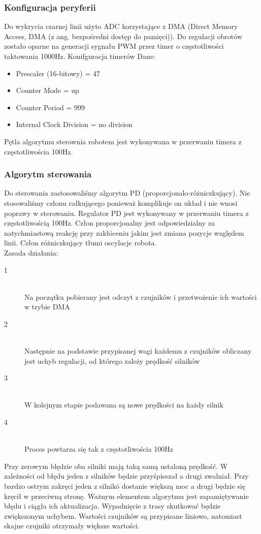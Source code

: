 \documentclass[12pt,a4paper]{article}
\begin{document}
\subsubsection{Konfiguracja peryferii}

Do wykrycia czarnej linii użyto ADC korzystające z DMA (Direct Memory Access, DMA (z ang. bezpośredni dostęp do pamięci)). Do regulacji obrotów zostało oparne na generacji sygnału PWM przez timer o częstotliwości taktowania 1000Hz. 
\newline Konifguracja timerów
\newline Dane:
\begin{itemize}
\item Prescaler (16-bitowy) = 47
\item Counter Mode = up
\item Counter Period = 999
\item Internal Clock Division = no division 
\end{itemize}
Pętla algorytmu sterownia robotem jest wykonywana w przerwaniu timera z częstotliwościa 100Hz.

\subsubsection{Algorytm sterowania}

Do sterowania zastosowaliśmy algorytm PD (proporcjonalo-różniczkujący). Nie stosowaliśmy członu całkującego ponieważ komplikuje on układ i nie wnosi poprawy w sterowaniu. Regulator PD jest wykonywany w przerwaniu timera z częstotliwością 100Hz. Człon proporcjonalny jest odpowiedzialny za natychmiastową reakcję przy zakłóceniu jakim jest zmiana pozycje względem linii. Człon różniczkujący tłumi oscylacje robota.
\\
\newline Zasada działania:
\begin{description}
\item[1] \hfill \\
 Na początku pobierany jest odczyt z czujników i przetwożenie ich wartości w trybie DMA
\item[2] \hfill \\
Następnie na podstawie przypisanej wagi każdemu z czujników obliczany jest uchyb regulacji, od którego zależy prędkość silników
\item[3] \hfill \\
W kolejnym etapie podawana są nowe prędkości na każdy silnik 
\item[4] \hfill \\
Proces powtarza się tak z częstotliwościa 100Hz
\end{description}
Przy zerowym blędzie oba silniki mają taką samą ustaloną prędkość. W zależności od błędu jeden z silników będzie przyśpieszał a drugi zwalniał. Przy bardzo ostrym zakręci jeden z silnikó dostanie większą moc a drugi będzie się kręcił w przeciwną stronę. Ważnym elementem algorytmu jest zapamiętywanie błędu i ciągła ich aktualizacja. Wypadnięcie z trasy skutkować będzie zwiększonym uchybem. Wartości czujników są przypisane liniowo, natomiast skajne czujniki otrzymały większe wartości. 
\end{document}
